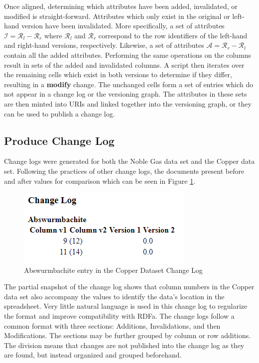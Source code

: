 Once aligned, determining which attributes have been added, invalidated, or modified is straight-forward.
Attributes which only exist in the original or left-hand version have been invalidated.
More specifically, a set of attributes \(\mathcal{I} = \mathcal{R}_{l} - \mathcal{R}_{r}\) where \(\mathcal{R}_{l}\) and \(\mathcal{R}_{r}\) correspond to the row identifiers of the left-hand and right-hand versions, respectively.
Likewise, a set of attributes \(\mathcal{A} = \mathcal{R}_{r} - \mathcal{R}_{l}\) contain all the added attributes.
Performing the same operations on the columns result in sets of the added and invalidated columns.
A script then iterates over the remaining cells which exist in both versions to determine if they differ, resulting in a \textbf{modify} change.
The unchanged cells form a set of entries which do not appear in a change log or the versioning graph.
The attributes in these sets are then minted into URIs and linked together into the versioning graph, or they can be used to publish a change log.

\subsection{Produce Change Log}

Change logs were generated for both the Noble Gas data set and the Copper data set.
Following the practices of other change logs, the documents present before and after values for comparison which can be seen in Figure \ref{changelog_zoomed}.
\begin{figure}
	\centering
	\includegraphics[scale=0.80]{figures/Changelog-zoomed.png}
	\caption{Abswurmbachite entry in the Copper Dataset Change Log}
	\label{changelog_zoomed}
\end{figure}
The partial snapshot of the change log shows that column numbers in the Copper data set also accompany the values to identify the data's location in the spreadsheet.
Very little natural language is used in this change log to regularize the format and improve compatibility with RDFa.
The change logs follow a common format with three sections: Additions, Invalidations, and then Modifications.
The sections may be further grouped by column or row additions.
The division means that changes are not published into the change log as they are found, but instead organized and grouped beforehand.

